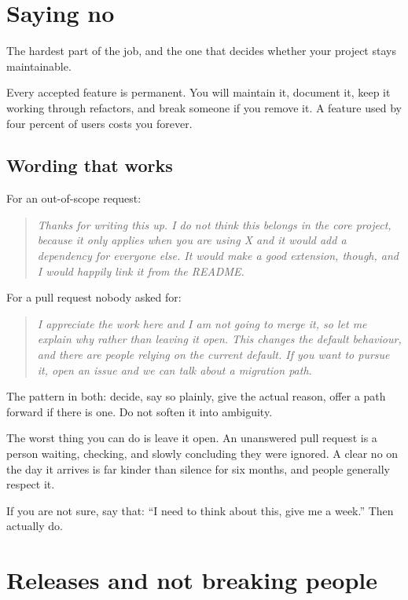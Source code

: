\documentclass[11pt]{article}
\begin{document}
\section{Saying no}

The hardest part of the job, and the one that decides whether your project stays
maintainable.

Every accepted feature is permanent. You will maintain it, document it, keep it
working through refactors, and break someone if you remove it. A feature used by four
percent of users costs you forever.

\subsection{Wording that works}

For an out-of-scope request:

\begin{quote}
\emph{Thanks for writing this up. I do not think this belongs in the core project,
because it only applies when you are using X and it would add a dependency for
everyone else. It would make a good extension, though, and I would happily link it
from the README.}
\end{quote}

For a pull request nobody asked for:

\begin{quote}
\emph{I appreciate the work here and I am not going to merge it, so let me explain
why rather than leaving it open. This changes the default behaviour, and there are
people relying on the current default. If you want to pursue it, open an issue and
we can talk about a migration path.}
\end{quote}

The pattern in both: decide, say so plainly, give the actual reason, offer a path
forward if there is one. Do not soften it into ambiguity.

\begin{trap}
The worst thing you can do is leave it open. An unanswered pull request is a person
waiting, checking, and slowly concluding they were ignored. A clear no on the day it
arrives is far kinder than silence for six months, and people generally respect it.

If you are not sure, say that: ``I need to think about this, give me a week.'' Then
actually do.
\end{trap}

\section{Releases and not breaking people}
\end{document}

